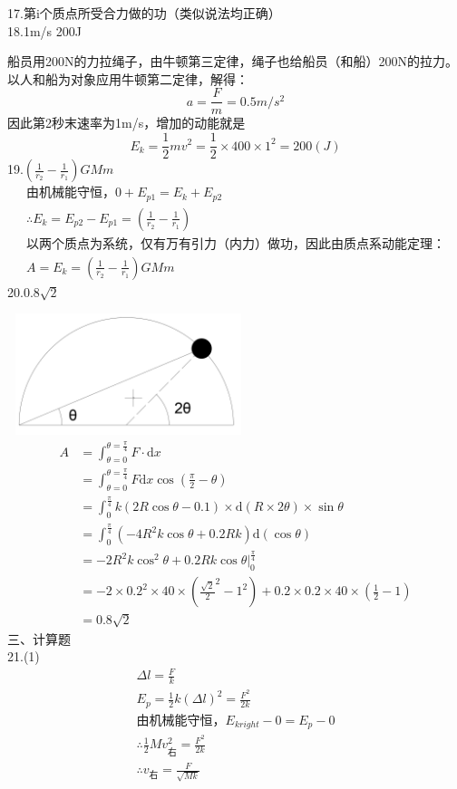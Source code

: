 \documentclass[a4paper,fleqn,twocolumn]{article}
\newcommand{\di}[1]{\mathrm{d}#1}
\begin{document}
   		17.第i个质点所受合力做的功（类似说法均正确）\\
   		18.1m/s \qquad 200J\par
   		船员用200N的力拉绳子，由牛顿第三定律，绳子也给船员（和船）200N的拉力。以人和船为对象应用牛顿第二定律，解得：
   		\[a=\frac{F}{m}=0.5m/s^2\]
   		因此第2秒末速率为1m/s，增加的动能就是
   		\[E_k=\frac{1}{2}mv^2=\frac{1}{2}\times400\times1^2=200(J)\]
   		19.$\left(\frac{1}{r_2}-\frac{1}{r_1}\right)GMm$ 
   		\begin{gather*}
   			\text{由机械能守恒，}0+E_{p1}=E_k+E_{p2}\\
   			\therefore E_k=E_{p2}-E_{p1}=\left(\frac{1}{r_2}-\frac{1}{r_1}\right)\\
   			\text{以两个质点为系统，仅有万有引力（内力）做功，因此由质点系动能定理：}\\
   			A=E_k=\left(\frac{1}{r_2}-\frac{1}{r_1}\right)GMm
   		\end{gather*}
   		20.$0.8\sqrt{2}$\par
   		\includegraphics[width=200pt,height=100pt]{Chp2_illus1.png}
   		\begin{align*}
   			A	&=\int_{\theta=0}^{\theta=\frac{\pi}{4}}F\cdot\di{x}\\
   				&=\int_{\theta=0}^{\theta=\frac{\pi}{4}}F\di{x}\cos\left(\frac{\pi}{2}-\theta\right)\\
   				&=\int_{0}^{\frac{\pi}{4}}k(2R\cos\theta-0.1)\times\di{(R\times 2\theta)}\times\sin\theta\\
   				&=\int_{0}^{\frac{\pi}{4}}(-4R^2k\cos\theta+0.2Rk)\di{(\cos\theta)}\\
   				&=-2R^2k\cos^2\theta+0.2Rk\cos\theta\left.\right|_0^{\frac{\pi}{4}}\\
   				&=-2\times 0.2^2\times 40\times({\frac{\sqrt{2}}{2}}^2-1^2)+0.2\times 0.2\times 40\times(\frac{1}{2}-1)\\
   				&=0.8\sqrt{2}
   		\end{align*}
   	三、计算题\\
   		21.(1)
   		\begin{gather*}
   			\Delta l=\frac{F}{k}\\
   			E_p=\frac{1}{2}k(\Delta l)^2=\frac{F^2}{2k}\\
   			\text{由机械能守恒，}E_{kright}-0=E_p-0\\
   			\therefore\frac{1}{2}Mv_{\text{右}}^2=\frac{F^2}{2k}\\
   			\therefore v_{\text{右}}=\frac{F}{\sqrt{Mk}}
   		\end{gather*}
\end{document}
